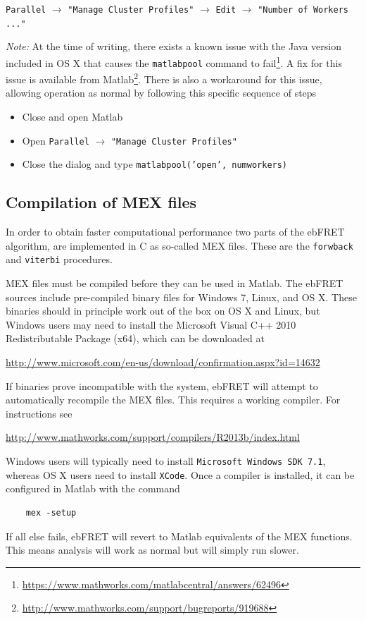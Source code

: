 \documentclass[12pt,article,oldfontcommands]{memoir}
\newcommand{\indt}{\qquad}
\begin{document}
\indt\texttt{Parallel} $\to$ \texttt{"Manage Cluster Profiles"} $\to$ \texttt{Edit} $\to$ \texttt{"Number of Workers ..."}

\emph{Note:} At the time of writing, there exists a known issue with the Java version included in OS X that causes the \texttt{matlabpool} command to fail\footnote{\url{https://www.mathworks.com/matlabcentral/answers/62496}}. A fix for this issue is available from Matlab\footnote{\url{http://www.mathworks.com/support/bugreports/919688}}. There is also a workaround for this issue, allowing operation as normal by following this specific sequence of steps

\begin{itemize}
\item[1.] Close and open Matlab
\item[2.] Open \texttt{Parallel} $\to$ \texttt{"Manage Cluster Profiles"}
\item[3.] Close the dialog and type \texttt{matlabpool('open', numworkers)}
\end{itemize}

\subsection{Compilation of MEX files}

In order to obtain faster computational performance two parts of the ebFRET algorithm, are implemented in C as so-called MEX files. These are the \texttt{forwback} and \texttt{viterbi} procedures. 

MEX files must be compiled before they can be used in Matlab. The ebFRET sources include pre-compiled binary files for Windows 7, Linux, and OS X. These binaries should in principle work out of the box on OS X and Linux, but Windows users may need to install the Microsoft Visual C++ 2010 Redistributable Package (x64), which can be downloaded at
    
\indt\url{http://www.microsoft.com/en-us/download/confirmation.aspx?id=14632}

If binaries prove incompatible with the system, ebFRET will attempt to automatically recompile the MEX files. This requires a working compiler. For instructions see

\indt\url{http://www.mathworks.com/support/compilers/R2013b/index.html}

Windows users will typically need to install \texttt{Microsoft Windows SDK 7.1}, whereas OS X users need to install \texttt{XCode}. Once a compiler is installed, it can be configured in Matlab with the command

\begin{verbatim}
    mex -setup
\end{verbatim}

If all else fails, ebFRET will revert to Matlab equivalents of the MEX functions. This means analysis will work as normal but will simply run slower.
\end{document}
